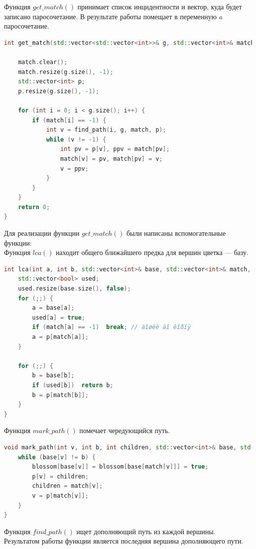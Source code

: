 \documentclass[14pt, a4paper]{extarticle}
\begin{document}
    Функция $get\_match()$ принимает список инцидентности и вектор, куда будет записано паросочетание. В результате работы помещает в переменную $a$ паросочетание.

    \begin{lstlisting}[language=c++]
int get_match(std::vector<std::vector<int>>& g, std::vector<int>& match) {

	match.clear();
	match.resize(g.size(), -1);
	std::vector<int> p;
	p.resize(g.size(), -1);

	for (int i = 0; i < g.size(); i++) {
		if (match[i] == -1) {
			int v = find_path(i, g, match, p);
			while (v != -1) {
				int pv = p[v], ppv = match[pv];
				match[v] = pv, match[pv] = v;
				v = ppv;
			}
		}
	}
	return 0;
}
    \end{lstlisting}

    \pagebreak

    Для реализации функции $get\_match()$ были написаны вспомогательные функции:\\

    Функция $lca()$ находит общего ближайшего предка для вершин цветка --- базу.

    \begin{lstlisting}[language=c++]
int lca(int a, int b, std::vector<int>& base, std::vector<int>& match, std::vector<int>& p) {
	std::vector<bool> used;
	used.resize(base.size(), false);
	for (;;) {
		a = base[a];
		used[a] = true;
		if (match[a] == -1)  break; // äîøëè äî êîðíÿ
		a = p[match[a]];
	}

	for (;;) {
		b = base[b];
		if (used[b])  return b;
		b = p[match[b]];
	}
}
    \end{lstlisting}

    Функция $mark\_path()$ помечает чередующийся путь. 

    \begin{lstlisting}[language=c++]
void mark_path(int v, int b, int children, std::vector<int>& base, std::vector<int>& match, std::vector<int>& p, std::vector<bool>& blossom) {
	while (base[v] != b) {
		blossom[base[v]] = blossom[base[match[v]]] = true;
		p[v] = children;
		children = match[v];
		v = p[match[v]];
	}
}

    \end{lstlisting}

    Функция $find\_path()$ ищет дополняющий путь из каждой вершины. Результатом работы функции является последняя вершина дополняющего пути.
\end{document}
